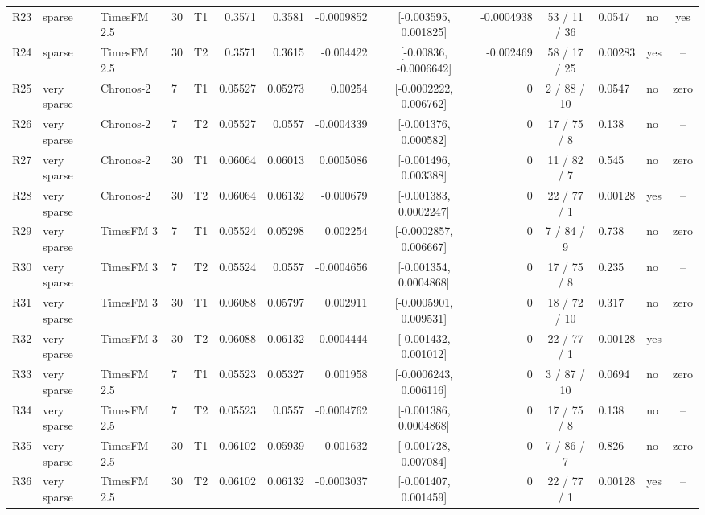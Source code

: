 \begin{table}
\begin{tabular}{llllcrrrcrcllc}
R23 & sparse & TimesFM 2.5 & 30 & T1 & 0.3571 & 0.3581 & -0.0009852 & [-0.003595, 0.001825] & -0.0004938 & 53 / 11 / 36 & 0.0547 & no & yes \\
R24 & sparse & TimesFM 2.5 & 30 & T2 & 0.3571 & 0.3615 & -0.004422 & [-0.00836, -0.0006642] & -0.002469 & 58 / 17 / 25 & 0.00283 & yes & -- \\
R25 & very sparse & Chronos-2 & 7 & T1 & 0.05527 & 0.05273 & 0.00254 & [-0.0002222, 0.006762] & 0 & 2 / 88 / 10 & 0.0547 & no & zero \\
R26 & very sparse & Chronos-2 & 7 & T2 & 0.05527 & 0.0557 & -0.0004339 & [-0.001376, 0.000582] & 0 & 17 / 75 / 8 & 0.138 & no & -- \\
R27 & very sparse & Chronos-2 & 30 & T1 & 0.06064 & 0.06013 & 0.0005086 & [-0.001496, 0.003388] & 0 & 11 / 82 / 7 & 0.545 & no & zero \\
R28 & very sparse & Chronos-2 & 30 & T2 & 0.06064 & 0.06132 & -0.000679 & [-0.001383, 0.0002247] & 0 & 22 / 77 / 1 & 0.00128 & yes & -- \\
R29 & very sparse & TimesFM 3 & 7 & T1 & 0.05524 & 0.05298 & 0.002254 & [-0.0002857, 0.006667] & 0 & 7 / 84 / 9 & 0.738 & no & zero \\
R30 & very sparse & TimesFM 3 & 7 & T2 & 0.05524 & 0.0557 & -0.0004656 & [-0.001354, 0.0004868] & 0 & 17 / 75 / 8 & 0.235 & no & -- \\
R31 & very sparse & TimesFM 3 & 30 & T1 & 0.06088 & 0.05797 & 0.002911 & [-0.0005901, 0.009531] & 0 & 18 / 72 / 10 & 0.317 & no & zero \\
R32 & very sparse & TimesFM 3 & 30 & T2 & 0.06088 & 0.06132 & -0.0004444 & [-0.001432, 0.001012] & 0 & 22 / 77 / 1 & 0.00128 & yes & -- \\
R33 & very sparse & TimesFM 2.5 & 7 & T1 & 0.05523 & 0.05327 & 0.001958 & [-0.0006243, 0.006116] & 0 & 3 / 87 / 10 & 0.0694 & no & zero \\
R34 & very sparse & TimesFM 2.5 & 7 & T2 & 0.05523 & 0.0557 & -0.0004762 & [-0.001386, 0.0004868] & 0 & 17 / 75 / 8 & 0.138 & no & -- \\
R35 & very sparse & TimesFM 2.5 & 30 & T1 & 0.06102 & 0.05939 & 0.001632 & [-0.001728, 0.007084] & 0 & 7 / 86 / 7 & 0.826 & no & zero \\
R36 & very sparse & TimesFM 2.5 & 30 & T2 & 0.06102 & 0.06132 & -0.0003037 & [-0.001407, 0.001459] & 0 & 22 / 77 / 1 & 0.00128 & yes & -- \\
\bottomrule
\end{tabular}
\end{table}

